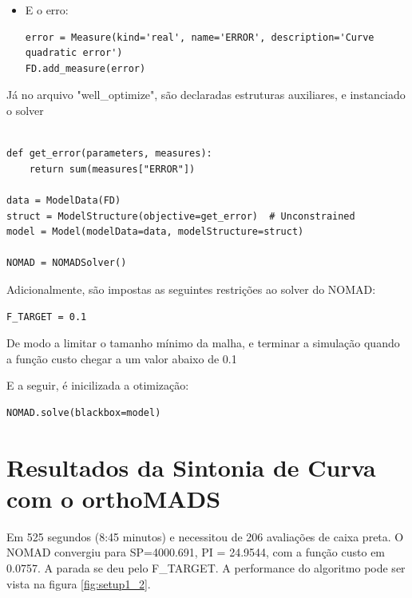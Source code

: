 \begin{itemize}
\item E o erro:
\begin{verbatim}
error = Measure(kind='real', name='ERROR', description='Curve quadratic error')
FD.add_measure(error)
\end{verbatim}
\end{itemize}

Já no arquivo "well\_optimize", são declaradas estruturas auxiliares, e instanciado o solver

\begin{verbatim}

def get_error(parameters, measures):
    return sum(measures["ERROR"])

data = ModelData(FD)
struct = ModelStructure(objective=get_error)  # Unconstrained
model = Model(modelData=data, modelStructure=struct)

NOMAD = NOMADSolver()

\end{verbatim}



Adicionalmente, são impostas as seguintes restrições ao solver do NOMAD:
\begin{verbatim}
F_TARGET = 0.1
\end{verbatim}

De modo a limitar o tamanho mínimo da malha, e terminar a simulação quando a função custo chegar a um valor abaixo de 0.1

E a seguir, é inicilizada a otimização:
\begin{verbatim}
NOMAD.solve(blackbox=model)
\end{verbatim}


\section{Resultados da Sintonia de Curva com o orthoMADS}

Em 525 segundos (8:45 minutos) e necessitou de 206 avaliações de caixa preta. O NOMAD convergiu para SP=4000.691, PI = 24.9544, com a função custo em 0.0757. A parada se deu pelo F\_TARGET. A performance do algoritmo pode ser vista na figura \ref{fig:setup1_2}.


